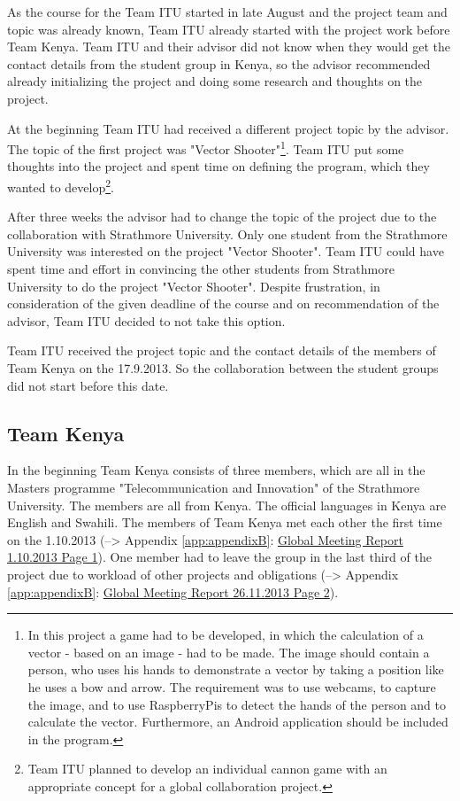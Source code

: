 As the course for the Team ITU started in late August and the project team and topic was already known, Team ITU already started with the project work before Team Kenya. Team ITU and their advisor did not know when they would get the contact details from the student group in Kenya, so the advisor recommended already initializing the project and doing some research and thoughts on the project.

At the beginning Team ITU had received a different project topic by the advisor. The topic of the first project was "Vector Shooter"\footnote{In this project a game had to be developed, in which the calculation of a vector - based on an image - had to be made. The image should contain a person, who uses his hands to demonstrate a vector by taking a position like he uses a bow and arrow. The requirement was to use webcams, to capture the image, and to use RaspberryPis to detect the hands of the person and to calculate the vector. Furthermore, an Android application should be included in the program.}. Team ITU put some thoughts into the project and spent time on defining the program, which they wanted to develop\footnote{Team ITU planned to develop an individual cannon game with an appropriate concept for a global collaboration project.}.

After three weeks the advisor had to change the topic of the project due to the collaboration with Strathmore University. Only one student from the Strathmore University was interested on the project "Vector Shooter". Team ITU could have spent time and effort in convincing the other students from Strathmore University to do the project "Vector Shooter". Despite frustration, in consideration of the given deadline of the course and on recommendation of the advisor, Team ITU decided to not take this option.

Team ITU received the project topic and the contact details of the members of Team Kenya on the 17.9.2013. So the collaboration between the student groups did not start before this date.


\subsection{Team Kenya}

In the beginning Team Kenya consists of three members, which are all in the Masters programme "Telecommunication and Innovation" of the Strathmore University. The members are all from Kenya. The official languages in Kenya are English and Swahili. The members of Team Kenya met each other the first time on the 1.10.2013 (--> Appendix \ref{app:appendixB}: \hyperlink{GSD20131001.1}{Global Meeting Report 1.10.2013 Page 1}). One member had to leave the group in the last third of the project due to workload of other projects and obligations (--> Appendix \ref{app:appendixB}: \hyperlink{GSD20131126.2}{Global Meeting Report 26.11.2013 Page 2}).

